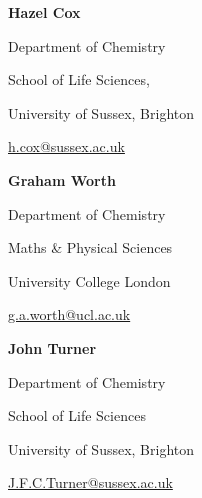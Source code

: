 



\begin{minipage}[t]{.3\linewidth}
	\raggedright
	\begin{description}
		\item \textbf{Hazel Cox}
		\item Department of Chemistry
		\item School of Life Sciences, 
		\item University of Sussex, Brighton
		\item \href{mailto:h.cox@sussex.ac.uk}{\textcolor{awesome-skyblue}{h.cox@sussex.ac.uk}}
	\end{description}
\end{minipage}%
\hfil
\begin{minipage}[t]{.3\linewidth}
	\raggedright
	\begin{description}
		\item \textbf{Graham Worth}
		\item Department of Chemistry
		\item Maths \& Physical Sciences
		\item University College London
		\item \href{mailto:g.a.worth@ucl.ac.uk}{\textcolor{awesome-skyblue}{g.a.worth@ucl.ac.uk}}
	\end{description}
\end{minipage}
\hfil
\begin{minipage}[t]{.3\linewidth}
	\raggedright
	\begin{description}
		\item \textbf{John Turner} 
		\item Department of Chemistry
		\item School of Life Sciences
		\item University of Sussex, Brighton
		\item \href{mailto:J.F.C.Turner@sussex.ac.uk}{\textcolor{awesome-skyblue}{J.F.C.Turner@sussex.ac.uk}}
	\end{description}
\end{minipage}%



